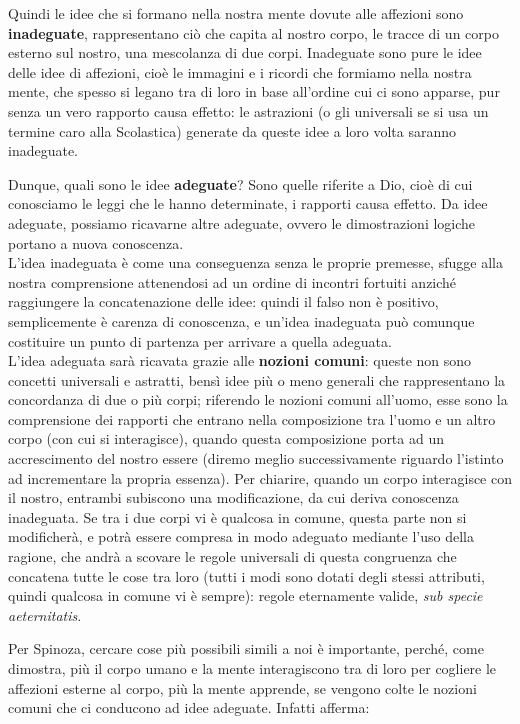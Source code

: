 Quindi le idee che si formano nella nostra mente dovute alle affezioni sono \textbf{inadeguate}, rappresentano ciò che capita al nostro corpo, le tracce di un corpo esterno sul nostro, una mescolanza di due corpi. Inadeguate sono pure le idee delle idee di affezioni, cioè le immagini e i ricordi che formiamo nella nostra mente, che spesso si legano tra di loro in base all'ordine cui ci sono apparse, pur senza un vero rapporto causa effetto: le astrazioni (o gli universali se si usa un termine caro alla Scolastica) generate da queste idee a loro volta saranno inadeguate.

Dunque, quali sono le idee \textbf{adeguate}? Sono quelle riferite a Dio, cioè di cui conosciamo le leggi che le hanno determinate, i rapporti causa effetto. Da idee adeguate, possiamo ricavarne altre adeguate, ovvero le dimostrazioni logiche portano a nuova conoscenza.\\L'idea inadeguata è come una conseguenza senza le proprie premesse, sfugge alla nostra comprensione attenendosi ad un ordine di incontri fortuiti anziché raggiungere la concatenazione delle idee: quindi il falso non è positivo, semplicemente è carenza di conoscenza, e un'idea inadeguata può comunque costituire un punto di partenza per arrivare a quella adeguata.\\
L'idea adeguata sarà ricavata grazie alle \textbf{nozioni comuni}: queste non sono concetti universali e astratti, bensì idee più o meno generali che rappresentano la concordanza di due o più corpi; riferendo le nozioni comuni all'uomo, esse sono la comprensione dei rapporti che entrano nella composizione tra l'uomo e un altro corpo (con cui si interagisce), quando questa composizione porta ad un accrescimento del nostro essere (diremo meglio successivamente riguardo l'istinto ad incrementare la propria essenza). Per chiarire, quando un corpo interagisce con il nostro, entrambi subiscono una modificazione, da cui deriva conoscenza inadeguata. Se tra i due corpi vi è qualcosa in comune, questa parte non si modificherà, e potrà essere compresa in modo adeguato mediante l'uso della ragione, che andrà a scovare le regole universali di questa congruenza che concatena tutte le cose tra loro (tutti i modi sono dotati degli stessi attributi, quindi qualcosa in comune vi è sempre): regole eternamente valide, \textit{sub specie aeternitatis}.

Per Spinoza, cercare cose più possibili simili a noi è importante, perché, come dimostra, più il corpo umano e la mente interagiscono tra di loro per cogliere le affezioni esterne al corpo, più la mente apprende, se vengono colte le nozioni comuni che ci conducono ad idee adeguate. Infatti afferma:

